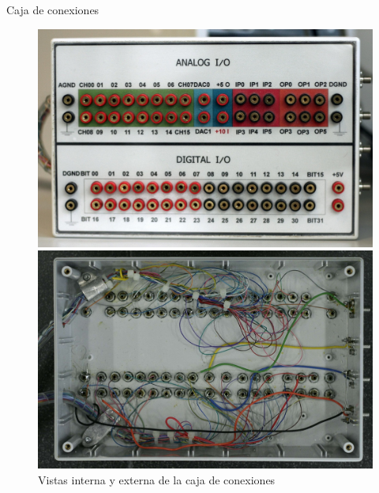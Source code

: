 \documentclass[utf8, compress]			{beamer}
\begin{document}
\begin{frame}{Caja de conexiones}
    \begin{center}
	\begin{figure}
	    \begin{minipage}[top][\exterior][c]{.4\textwidth}
		\includegraphics[angle=90]{exterior.jpg}
	    \end{minipage}
	    \begin{minipage}[top][\exterior][c]{.4\textwidth}
		\includegraphics[angle=90]{interior.jpg}
	    \end{minipage}
	    \caption{Vistas interna y externa de la caja de conexiones}
	    \label{fig:connectionbox}
	\end{figure}
    \end{center}
\end{frame}
\end{document}
